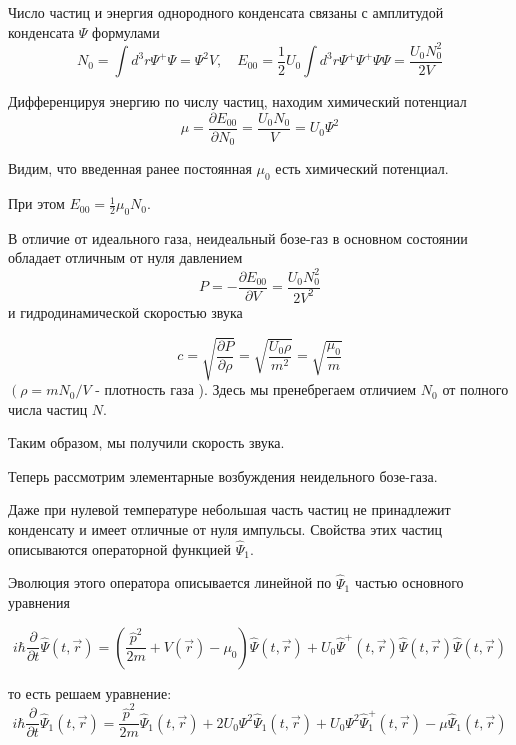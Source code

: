 \documentclass[a4paper,12pt]{article} %
\begin{document}
\begin{ttask}
Число частиц и энергия однородного конденсата связаны с амплитудой конденсата $\Psi$ формулами
$$
N_{0}
=
\int d^{3} r \Psi^{+} \Psi
=
\Psi^{2} V, 
\quad
E_{00}
=
\frac{1}{2} U_{0} \int d^{3} r \Psi^{+} \Psi^{+} \Psi \Psi
=
\frac{U_{0} N_{0}^{2}}{2 V}
$$


Дифференцируя энергию по числу частиц, находим химический потенциал
$$
\mu
=
\frac{\partial E_{00}}{\partial N_{0}}
=
\frac{U_{0} N_{0}}{V}
=
U_{0} \Psi^{2}
$$


Видим, что введенная ранее постоянная $\mu_{0}$ есть химический потенциал. 

При этом $E_{00}=\frac{1}{2} \mu_{0} N_{0} .$ 

В отличие от идеального газа, 
неидеальный бозе-газ в основном состоянии обладает отличным от нуля давлением
$$
P=-\frac{\partial E_{00}}{\partial V}=\frac{U_{0} N_{0}^{2}}{2 V^{2}}
$$
и гидродинамической скоростью звука




$$
c=\sqrt{\frac{\partial P}{\partial \rho}}=\sqrt{\frac{U_{0} \rho}{m^{2}}}=\sqrt{\frac{\mu_{0}}{m}}
$$
$\left(\rho=m N_{0} / V\right.$ - плотность газа ). Здесь мы пренебрегаем отличием $N_{0}$ от полного числа частиц $N$.




Таким образом, мы получили скорость звука.









Теперь рассмотрим элементарные возбуждения неидельного бозе-газа.


Даже при нулевой температуре небольшая часть частиц не принадлежит 
конденсату и имеет отличные от нуля импульсы. 
Свойства этих частиц описываются операторной функцией $\hat{\Psi}_{1}$. 

Эволюция этого оператора описывается линейной по $\hat{\Psi}_{1}$ 
частью основного уравнения 

\[ i \hbar \frac{\partial}{\partial t} \hat{\Psi}(t, \vec{r})
=
\left(\frac{\hat{p}^{2}}{2 m}+V(\vec{r})-\mu_{0}\right) 
\hat{\Psi}(t, \vec{r})
+
U_{0} \hat{\Psi}^{+}(t, \vec{r}) \hat{\Psi}(t, \vec{r}) \hat{\Psi}(t, \vec{r}) \]


то есть решаем уравнение:
$$
i \hbar \frac{\partial}{\partial t} \hat{\Psi}_{1}(t, \vec{r})
=
\frac{\hat{p}^{2}}{2 m} \hat{\Psi}_{1}(t, \vec{r})
+
2 U_{0} \Psi^{2} \hat{\Psi}_{1}(t, \vec{r})
+
U_{0} \Psi^{2} \hat{\Psi}_{1}^{+}(t, \vec{r})
-
\mu \hat{\Psi}_{1}(t, \vec{r})
$$





\end{ttask}
\end{document}
